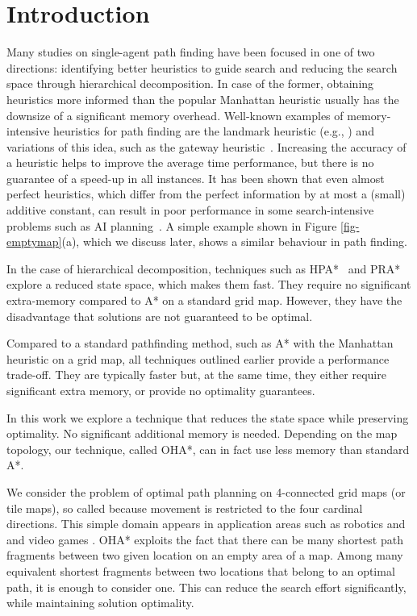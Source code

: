 \section{Introduction}
Many studies on single-agent path finding have been focused in one of two directions:
identifying better heuristics to 
guide search and reducing the search space through hierarchical decomposition.
In case of the former, obtaining heuristics more informed than the popular
Manhattan heuristic usually has the downsize of a significant memory overhead.
Well-known examples of memory-intensive heuristics for path finding are
the landmark heuristic (e.g., \cite{Cazenave:06}) and variations of this idea, such as the 
gateway heuristic~\cite{bjornsson06}.
Increasing the accuracy of a heuristic helps to improve the average time performance,
but there is no guarantee of a speed-up in all instances.
It has been shown that even almost perfect heuristics,
which differ from the perfect information by at most a (small) additive constant,
can result in poor performance in some search-intensive problems such as AI planning~\cite{helmert08,korf98}.
A simple example shown in Figure \ref{fig-emptymap}(a), which we discuss later,
shows a similar behaviour in path finding.

In the case of hierarchical decomposition, techniques such as
HPA*~\cite{botea04} and PRA*~\cite{sturtevant05} explore a reduced state space, 
which makes them fast. They require no significant extra-memory
compared to A* on a standard grid map.
However, they have the disadvantage that solutions are not guaranteed 
to be optimal.

Compared to a standard pathfinding method, such as A* with 
the Manhattan heuristic on a grid map,
all techniques outlined earlier provide a performance trade-off.
They are typically faster but, at the same time, they either require significant
extra memory, or provide no optimality guarantees.

In this work we explore a technique that reduces the state space while preserving optimality.
No significant additional memory is needed. Depending on the map topology,
our technique, called OHA*, can in fact use less memory than standard A*.

We consider the problem of optimal path planning on 4-connected grid maps (or tile maps), so called because movement is restricted to the four cardinal directions.
This simple domain appears in application areas such as robotics and \cite{latombe91} and video games
\cite{tozour02}.
OHA* exploits the fact that
there can be many shortest path fragments between two given location
on an empty area of a map.
Among many equivalent shortest fragments between two locations that belong to an optimal path,
it is enough to consider one.
This can reduce the search effort significantly, while maintaining solution optimality.

